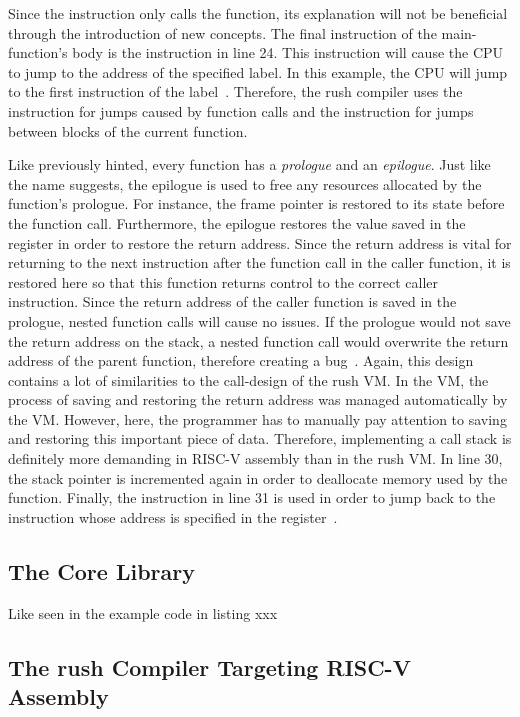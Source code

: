 Since the  instruction only calls the  function, its explanation will not be beneficial through the introduction of new concepts.
The final instruction of the main-function's body is the  instruction in line 24.
This instruction will cause the CPU to jump to the address of the specified label.
In this example, the CPU will jump to the first instruction of the  label~\cite[p.~17]{Patterson2017}.
Therefore, the rush compiler uses the  instruction for jumps caused by function calls and the  instruction for jumps between blocks of the current function.

Like previously hinted, every function has a \emph{prologue} and an \emph{epilogue}.
Just like the name suggests, the epilogue is used to free any resources allocated by the function's prologue.
For instance, the frame pointer is restored to its state before the function call.
Furthermore, the epilogue restores the value saved in the  register in order to restore the return address.
Since the return address is vital for returning to the next instruction after the function call in the caller function, it is restored here so that this function returns control to the correct caller instruction.
Since the return address of the caller function is saved in the prologue, nested function calls will cause no issues.
If the prologue would not save the return address on the stack, a nested function call would overwrite the return address of the parent function, therefore creating a bug~\cite[p.33]{Patterson2017}.
Again, this design contains a lot of similarities to the call-design of the rush VM\@.
In the VM, the process of saving and restoring the return address was managed automatically by the VM\@.
However, here, the programmer has to manually pay attention to saving and restoring this important piece of data.
Therefore, implementing a call stack is definitely more demanding in RISC-V assembly than in the rush VM\@.
In line 30, the stack pointer is incremented again in order to deallocate memory used by the function.
Finally, the  instruction in line 31 is used in order to jump back to the instruction whose address is specified in the  register~\cite[reference]{Patterson2017}.

\subsection{The Core Library}

Like seen in the example code in listing xxx

\subsection{The rush Compiler Targeting RISC-V Assembly}

